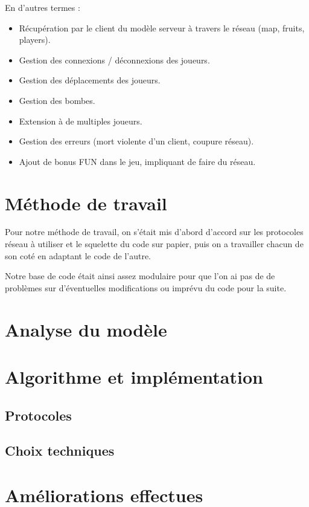 \documentclass[a4paper]{article}
\begin{document}
	En d'autres termes :
	\begin{itemize}
\item Récupération par le client du modèle serveur à travers le réseau (map, fruits, players).
\item Gestion des connexions / déconnexions des joueurs.
\item Gestion des déplacements des joueurs.
\item Gestion des bombes.
\item Extension à de multiples joueurs.
\item Gestion des erreurs (mort violente d'un client, coupure réseau).
\item Ajout de bonus FUN dans le jeu, impliquant de faire du réseau.
	\end{itemize}
	
	\section{Méthode de travail}
	
	Pour notre méthode de travail, on s'était mis d'abord d'accord sur les protocoles réseau à utiliser et le squelette du code sur papier, puis on a travailler chacun de son coté en adaptant le code de l'autre.
	
	Notre base de code était ainsi assez modulaire pour que l'on ai pas de de problèmes sur d'éventuelles modifications ou imprévu du code pour la suite.
	
	\section{Analyse du modèle}
	
	
	
	\section{Algorithme et implémentation}
		\subsection{Protocoles}
		
		\subsection{Choix techniques}
	
	
	\section{Améliorations effectues}
\end{document}
